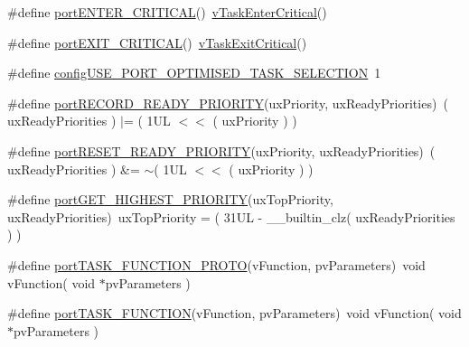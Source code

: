 \begin{DoxyCompactItemize}
\item 
\#define \hyperlink{externals_2freertos_2portable_2_g_c_c_2_r_i_s_c-_v_2portmacro_8h_a8a09321ad004019f3c8d0f2e4d7224c7}{port\+E\+N\+T\+E\+R\+\_\+\+C\+R\+I\+T\+I\+C\+AL}()~\hyperlink{externals_2freertos_2portable_2_g_c_c_2_r_i_s_c-_v_2portmacro_8h_af7496ea503bc46ef98e35db9ce9d747f}{v\+Task\+Enter\+Critical}()
\item 
\#define \hyperlink{externals_2freertos_2portable_2_g_c_c_2_r_i_s_c-_v_2portmacro_8h_a529358e6147881dd881c890ade21c9bd}{port\+E\+X\+I\+T\+\_\+\+C\+R\+I\+T\+I\+C\+AL}()~\hyperlink{externals_2freertos_2portable_2_g_c_c_2_r_i_s_c-_v_2portmacro_8h_ab2026aedc871bc29b9ef3f88c08e2e85}{v\+Task\+Exit\+Critical}()
\item 
\#define \hyperlink{externals_2freertos_2portable_2_g_c_c_2_r_i_s_c-_v_2portmacro_8h_aebb8c3a87d591f60f974772be0ee798d}{config\+U\+S\+E\+\_\+\+P\+O\+R\+T\+\_\+\+O\+P\+T\+I\+M\+I\+S\+E\+D\+\_\+\+T\+A\+S\+K\+\_\+\+S\+E\+L\+E\+C\+T\+I\+ON}~1
\item 
\#define \hyperlink{externals_2freertos_2portable_2_g_c_c_2_r_i_s_c-_v_2portmacro_8h_a113cd9b8401284194da8ddc4569aa484}{port\+R\+E\+C\+O\+R\+D\+\_\+\+R\+E\+A\+D\+Y\+\_\+\+P\+R\+I\+O\+R\+I\+TY}(ux\+Priority,  ux\+Ready\+Priorities)~( ux\+Ready\+Priorities ) $\vert$= ( 1\+U\+L $<$$<$ ( ux\+Priority ) )
\item 
\#define \hyperlink{externals_2freertos_2portable_2_g_c_c_2_r_i_s_c-_v_2portmacro_8h_aab771d12c0912d93d52a586628fb18a6}{port\+R\+E\+S\+E\+T\+\_\+\+R\+E\+A\+D\+Y\+\_\+\+P\+R\+I\+O\+R\+I\+TY}(ux\+Priority,  ux\+Ready\+Priorities)~( ux\+Ready\+Priorities ) \&= $\sim$( 1\+U\+L $<$$<$ ( ux\+Priority ) )
\item 
\#define \hyperlink{externals_2freertos_2portable_2_g_c_c_2_r_i_s_c-_v_2portmacro_8h_a5ed536be98084ed8c77c95d79a2688ee}{port\+G\+E\+T\+\_\+\+H\+I\+G\+H\+E\+S\+T\+\_\+\+P\+R\+I\+O\+R\+I\+TY}(ux\+Top\+Priority,  ux\+Ready\+Priorities)~ux\+Top\+Priority = ( 31\+U\+L -\/ \+\_\+\+\_\+builtin\+\_\+clz( ux\+Ready\+Priorities ) )
\item 
\#define \hyperlink{externals_2freertos_2portable_2_g_c_c_2_r_i_s_c-_v_2portmacro_8h_a2921e1c5a1f974dfa01ae44d1f665f14}{port\+T\+A\+S\+K\+\_\+\+F\+U\+N\+C\+T\+I\+O\+N\+\_\+\+P\+R\+O\+TO}(v\+Function,  pv\+Parameters)~void v\+Function( void $\ast$pv\+Parameters )
\item 
\#define \hyperlink{externals_2freertos_2portable_2_g_c_c_2_r_i_s_c-_v_2portmacro_8h_a3a289793652f505c538abea27045ccdf}{port\+T\+A\+S\+K\+\_\+\+F\+U\+N\+C\+T\+I\+ON}(v\+Function,  pv\+Parameters)~void v\+Function( void $\ast$pv\+Parameters )

\end{DoxyCompactItemize}
